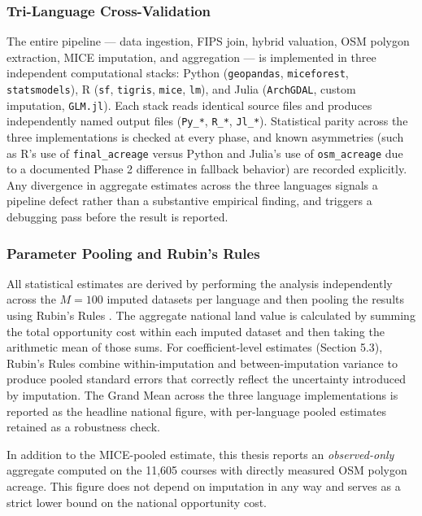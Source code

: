 \documentclass[11pt, letterpaper]{article}
\begin{document}
\subsubsection{Tri-Language Cross-Validation}

The entire pipeline --- data ingestion, FIPS join, hybrid valuation, OSM polygon extraction, MICE imputation, and aggregation --- is implemented in three independent computational stacks: Python (\texttt{geopandas}, \texttt{miceforest}, \texttt{statsmodels}), R (\texttt{sf}, \texttt{tigris}, \texttt{mice}, \texttt{lm}), and Julia (\texttt{ArchGDAL}, custom imputation, \texttt{GLM.jl}). Each stack reads identical source files and produces independently named output files (\texttt{Py\_*}, \texttt{R\_*}, \texttt{Jl\_*}). Statistical parity across the three implementations is checked at every phase, and known asymmetries (such as R's use of \texttt{final\_acreage} versus Python and Julia's use of \texttt{osm\_acreage} due to a documented Phase 2 difference in fallback behavior) are recorded explicitly. Any divergence in aggregate estimates across the three languages signals a pipeline defect rather than a substantive empirical finding, and triggers a debugging pass before the result is reported.

\subsubsection{Parameter Pooling and Rubin's Rules}

All statistical estimates are derived by performing the analysis independently across the $M = 100$ imputed datasets per language and then pooling the results using Rubin's Rules \parencite{Rubin1987, Burren2018}. The aggregate national land value is calculated by summing the total opportunity cost within each imputed dataset and then taking the arithmetic mean of those sums. For coefficient-level estimates (Section 5.3), Rubin's Rules combine within-imputation and between-imputation variance to produce pooled standard errors that correctly reflect the uncertainty introduced by imputation. The Grand Mean across the three language implementations is reported as the headline national figure, with per-language pooled estimates retained as a robustness check.

In addition to the MICE-pooled estimate, this thesis reports an \textit{observed-only} aggregate computed on the 11,605 courses with directly measured OSM polygon acreage. This figure does not depend on imputation in any way and serves as a strict lower bound on the national opportunity cost.
\end{document}
